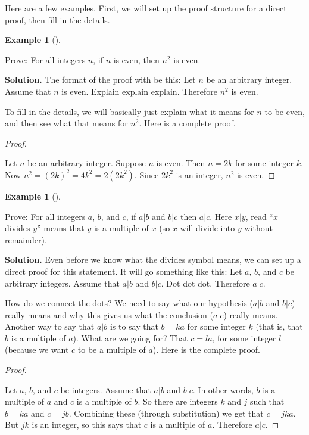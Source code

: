 \documentclass[10pt,]{book}
\theoremstyle{plain}
\theoremstyle{definition}
\newtheorem{example}[theorem]{Example}
\theoremstyle{definition}
\theoremstyle{definition}
\numberwithin{equation}{chapter}
\begin{document}
Here are a few examples. First, we will set up the proof structure for a direct proof, then fill in the details.
%
\begin{example}[]\label{example-89}

Prove: For all integers \(n\), if \(n\) is even, then \(n^2\) is even.
%
\par\medskip\noindent%
\textbf{Solution.}\quad
The format of the proof with be this: Let \(n\) be an arbitrary integer. Assume that \(n\) is even. Explain explain explain. Therefore \(n^2\) is even.
%
\par

To fill in the details, we will basically just explain what it means for \(n\) to be even, and then see what that means for \(n^2\). Here is a complete proof.
%
\begin{proof}\hypertarget{proof-33}{}

Let \(n\) be an arbitrary integer. Suppose \(n\) is even. Then \(n = 2k\) for some integer \(k\). Now \(n^2 = (2k)^2 = 4k^2 = 2(2k^2)\). Since \(2k^2\) is an integer, \(n^2\) is even.
%
\end{proof}
\end{example}
\begin{example}[]\label{example-90}

Prove: For all integers \(a\), \(b\), and \(c\), if \(a|b\) and \(b|c\) then \(a|c\). Here \(x|y\), read ``\(x\) divides \(y\)'' means that \(y\) is a multiple of \(x\) (so \(x\) will divide into \(y\) without remainder).
%
\par\medskip\noindent%
\textbf{Solution.}\quad
Even before we know what the divides symbol means, we can set up a direct proof for this statement. It will go something like this: Let \(a\), \(b\), and \(c\) be arbitrary integers. Assume that \(a|b\) and \(b|c\). Dot dot dot. Therefore \(a|c\).
%
\par

How do we connect the dots? We need to say what our hypothesis (\(a|b\) and \(b|c\)) really means and why this gives us what the conclusion (\(a|c\)) really means. Another way to say that \(a|b\) is to say that \(b = ka\) for some integer \(k\) (that is, that \(b\) is a multiple of \(a\)). What are we going for? That \(c = la\), for some integer \(l\) (because we want \(c\) to be a multiple of \(a\)). Here is the complete proof.
%
\begin{proof}\hypertarget{proof-34}{}

Let \(a\), \(b\), and \(c\) be integers. Assume that \(a|b\) and \(b|c\). In other words, \(b\) is a multiple of \(a\) and \(c\) is a multiple of \(b\). So there are integers \(k\) and \(j\) such that \(b = ka\) and \(c = jb\). Combining these (through substitution) we get that \(c = jka\). But \(jk\) is an integer, so this says that \(c\) is a multiple of \(a\). Therefore \(a|c\).
%
\end{proof}
\end{example}
\typeout{************************************************}
\typeout{************************************************}
\end{document}

